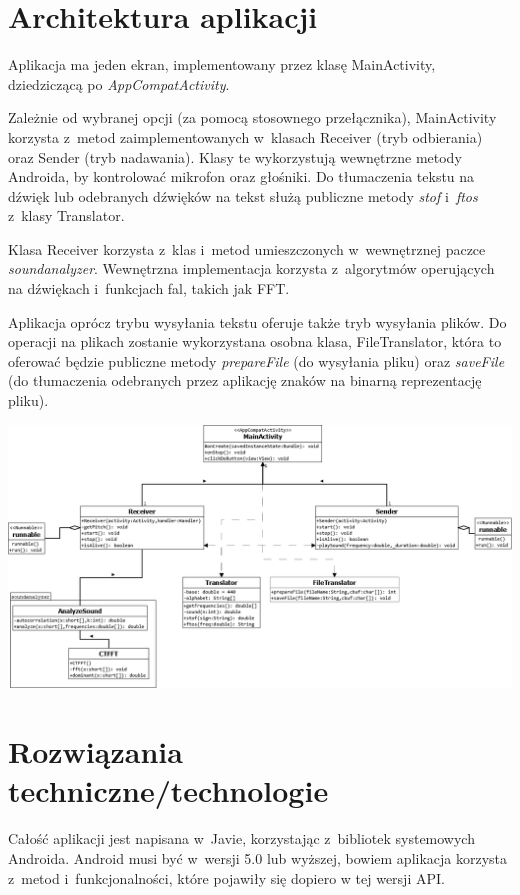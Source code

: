 \documentclass{article}
\begin{document}
\section{Architektura aplikacji}
Aplikacja ma jeden ekran, implementowany przez klasę MainActivity, dziedziczącą 
po \textit{AppCompatActivity}. \par
Zależnie od wybranej opcji (za pomocą stosownego przełącznika), MainActivity
korzysta z~metod zaimplementowanych w~klasach Receiver (tryb odbierania) oraz
Sender (tryb nadawania). Klasy te wykorzystują wewnętrzne metody Androida, by
kontrolować mikrofon oraz głośniki. Do tłumaczenia tekstu na dźwięk lub 
odebranych dźwięków na tekst służą publiczne metody \textit{stof} 
i~\textit{ftos} z~klasy Translator. \par
Klasa Receiver korzysta z~klas i~metod umieszczonych w~wewnętrznej paczce
\textit{soundanalyzer}. Wewnętrzna implementacja korzysta z~algorytmów
operujących na dźwiękach i~funkcjach fal, takich jak FFT. \par
Aplikacja oprócz trybu wysyłania tekstu oferuje także tryb wysyłania plików.
Do operacji na plikach zostanie wykorzystana osobna klasa, FileTranslator, która
to oferować będzie publiczne metody \textit{prepareFile} (do wysyłania pliku)
oraz \textit{saveFile} (do tłumaczenia odebranych przez aplikację znaków na
binarną reprezentację pliku). \par
\vspace{5mm}
\includegraphics[width=\textwidth]{app_uml.png}

\section{Rozwiązania techniczne/technologie}
Całość aplikacji jest napisana w~Javie, korzystając z~bibliotek systemowych
Androida. Android musi być w~wersji 5.0 lub wyższej, bowiem aplikacja korzysta
z~metod i~funkcjonalności, które pojawiły się dopiero w tej wersji API.
\end{document}

